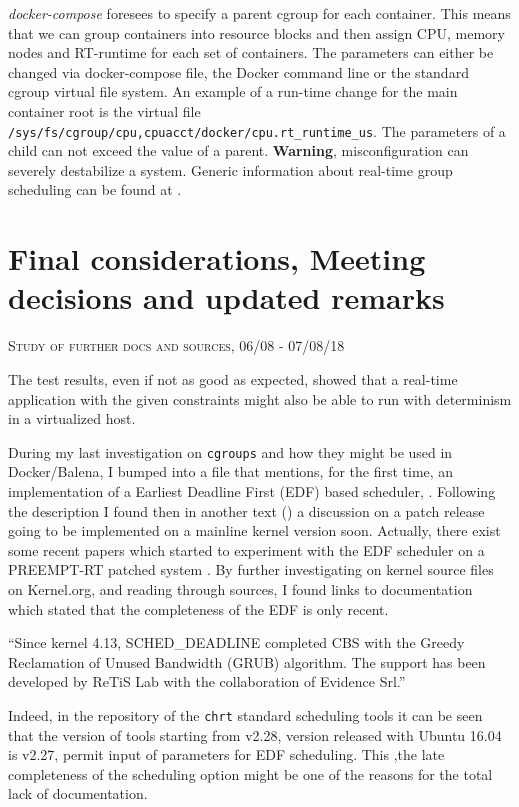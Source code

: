 \documentclass[]{scrartcl}
\begin{document}
\textit{docker-compose} foresees to specify a parent cgroup for each container. This means that we can group containers into resource blocks and then assign CPU, memory nodes and RT-runtime for each set of containers.
The parameters can either be changed via docker-compose file, the Docker command line or the standard cgroup virtual file system. An example of a run-time change for the main container root is the virtual file \texttt{/sys/fs/cgroup/cpu,cpuacct/docker/cpu.rt\_runtime\_us}.
The parameters of a child can not exceed the value of a parent. \textbf{Warning}, misconfiguration can severely destabilize a system. Generic information about real-time group scheduling can be found at \cite{kernel01}.

\section{Final considerations, Meeting decisions and updated remarks}

{\small\textsc{Study of further docs and sources, 06/08 - 07/08/18} \bigskip}

The test results, even if not as good as expected, showed that a real-time application with the given constraints might also be able to run with determinism in a virtualized host.
 
During my last investigation on \texttt{cgroups} and how they might be used in Docker/Balena, I bumped into a file that mentions, for the first time, an implementation of a Earliest Deadline First (EDF) based scheduler, \cite{kernel01}.
Following the description I found then in another text
(\cite{kernel02}) a discussion on a patch release going to be implemented on a mainline kernel version soon. Actually, there exist some recent papers which started to experiment with the EDF scheduler on a PREEMPT-RT patched system \cite{Buelnaetal2017}.
By further investigating on kernel source files on Kernel.org, and reading through sources, I found links to documentation \cite{wiki01} which stated that the completeness of the EDF is only recent.
\bigskip

``Since kernel 4.13, SCHED\_DEADLINE completed CBS with the Greedy Reclamation of Unused Bandwidth (GRUB) algorithm. The support has been developed by ReTiS Lab with the collaboration of Evidence Srl.''
\bigskip

Indeed, in the repository of the \texttt{chrt} standard scheduling tools \cite{schtools01} it can be seen that the version of tools starting from v2.28, version released with Ubuntu 16.04 is v2.27, permit input of  parameters for EDF scheduling.
This ,the late completeness of the scheduling option might be one of the reasons for the total lack of documentation.
\end{document}
